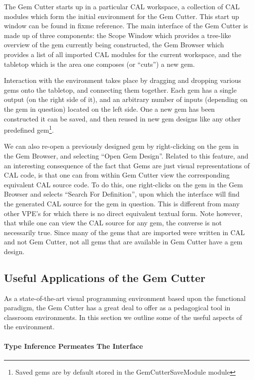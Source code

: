 The Gem Cutter starts up in a particular CAL workspace, a collection of CAL modules which form the initial environment for the Gem Cutter.  This start up window can be found in fixme reference.  The main interface of the Gem Cutter is made up of three components: the Scope Window which provides a tree-like overview of the gem currently being constructed, the Gem Browser which provides a list of all imported CAL modules for the current workspace, and the tabletop which is the area one composes (or ``cuts'') a new gem.

Interaction with the environment takes place by dragging and dropping various gems onto the tabletop, and connecting them together.  Each gem has a single output (on the right side of it), and an arbitrary number of inputs (depending on the gem in question) located on the left side.  One a new gem has been constructed it can be saved, and then reused in new gem designs like any other predefined gem\footnote{Saved gems are by default stored in the GemCutterSaveModule module}.

We can also re-open a previously designed gem by right-clicking on the gem in the Gem Browser, and selecting ``Open Gem Design''.  Related to this feature, and an interesting consequence of the fact that Gems are just visual representations of CAL code, is that one can from within Gem Cutter view the corresponding equivalent CAL source code.  To do this, one right-clicks on the gem in the Gem Browser and selects ``Search For Definition'', upon which the interface will find the generated CAL source for the gem in question.  This is different from many other VPE's for which there is no direct equivalent textual form.  Note however, that while one can view the CAL source for any gem, the converse is not necessarily true.  Since many of the gems that are imported were written in CAL and not Gem Cutter, not all gems that are available in Gem Cutter have a gem design.


\subsection{Useful Applications of the Gem Cutter}
\label{sec:gemCutterUsefulApps}

As a state-of-the-art visual programming environment based upon the functional paradigm, the Gem Cutter has a great deal to offer as a pedagogical tool in classroom environments.  In this section we outline some of the useful aspects of the environment.

\paragraph{Type Inference Permeates The Interface} 

